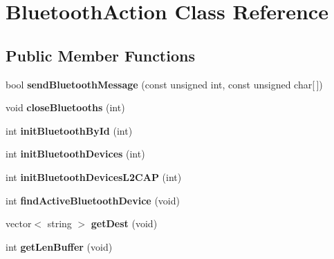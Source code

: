 \hypertarget{classBluetoothAction}{}\section{Bluetooth\+Action Class Reference}
\label{classBluetoothAction}
\subsection*{Public Member Functions}
\begin{DoxyCompactItemize}
\item 
bool {\bfseries send\+Bluetooth\+Message} (const unsigned int, const unsigned char\mbox{[}$\,$\mbox{]})\hypertarget{classBluetoothAction_a63f596c6a88dfd368fa40c722d8a2698}{}\label{classBluetoothAction_a63f596c6a88dfd368fa40c722d8a2698}

\item 
void {\bfseries close\+Bluetooths} (int)\hypertarget{classBluetoothAction_aaf87cb1b546d873612ff03d197f1f8d5}{}\label{classBluetoothAction_aaf87cb1b546d873612ff03d197f1f8d5}

\item 
int {\bfseries init\+Bluetooth\+By\+Id} (int)\hypertarget{classBluetoothAction_a655f5b37b80cd0622220d70076758840}{}\label{classBluetoothAction_a655f5b37b80cd0622220d70076758840}

\item 
int {\bfseries init\+Bluetooth\+Devices} (int)\hypertarget{classBluetoothAction_a2afd9e815bec567f858dff22f7a69f35}{}\label{classBluetoothAction_a2afd9e815bec567f858dff22f7a69f35}

\item 
int {\bfseries init\+Bluetooth\+Devices\+L2\+C\+AP} (int)\hypertarget{classBluetoothAction_a1f1d43ba5586bc28d983e869f218777f}{}\label{classBluetoothAction_a1f1d43ba5586bc28d983e869f218777f}

\item 
int {\bfseries find\+Active\+Bluetooth\+Device} (void)\hypertarget{classBluetoothAction_aafd69e27bb39843b629ad86ba83dc76a}{}\label{classBluetoothAction_aafd69e27bb39843b629ad86ba83dc76a}

\item 
vector$<$ string $>$ {\bfseries get\+Dest} (void)\hypertarget{classBluetoothAction_a912b6c2051a1e37ff850b7af7d6a22c4}{}\label{classBluetoothAction_a912b6c2051a1e37ff850b7af7d6a22c4}

\item 
int {\bfseries get\+Len\+Buffer} (void)\hypertarget{classBluetoothAction_adb19568578c66cd43cd553ab02a176ab}{}\label{classBluetoothAction_adb19568578c66cd43cd553ab02a176ab}


\end{DoxyCompactItemize}
